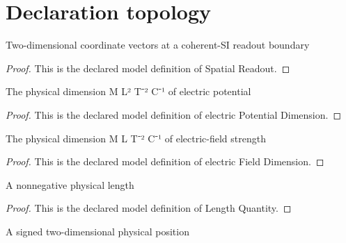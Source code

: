 \section{Declaration topology}
\begin{definition}
  \label{def:physics:phyx-mini-0874:phyxminiproblems-problemphyxmini0874-spatialreadout}
  Two-dimensional coordinate vectors at a coherent-SI readout boundary
\end{definition}
\begin{proof}
  This is the declared model definition of Spatial Readout.
\end{proof}
\begin{definition}
  \label{def:physics:phyx-mini-0874:phyxminiproblems-problemphyxmini0874-electricpotentialdimension}
  The physical dimension M L² T⁻² C⁻¹ of electric potential
\end{definition}
\begin{proof}
  This is the declared model definition of electric Potential Dimension.
\end{proof}
\begin{definition}
  \label{def:physics:phyx-mini-0874:phyxminiproblems-problemphyxmini0874-electricfielddimension}
  The physical dimension M L T⁻² C⁻¹ of electric-field strength
\end{definition}
\begin{proof}
  This is the declared model definition of electric Field Dimension.
\end{proof}
\begin{definition}
  \label{def:physics:phyx-mini-0874:phyxminiproblems-problemphyxmini0874-lengthquantity}
  A nonnegative physical length
\end{definition}
\begin{proof}
  This is the declared model definition of Length Quantity.
\end{proof}
\begin{definition}
  \label{def:physics:phyx-mini-0874:phyxminiproblems-problemphyxmini0874-positionquantity}
  A signed two-dimensional physical position
\end{definition}
